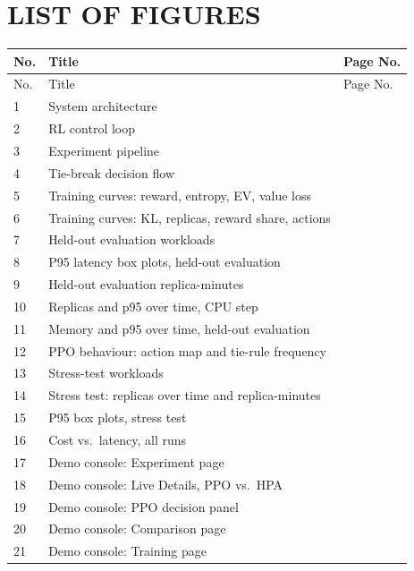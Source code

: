 \chapter*{\centering LIST OF FIGURES}
\label{ch:lof}

\begin{center}
\small
\renewcommand{\arraystretch}{0.92}
\begin{longtable}{p{1.0cm}p{10.5cm}p{2.0cm}}
\toprule
No. & Title & Page No. \\
\midrule
\endfirsthead
\toprule
No. & Title & Page No. \\
\midrule
\endhead
1 & System architecture & \pageref{fig:system-architecture} \\
2 & RL control loop & \pageref{fig:rl-control-loop} \\
3 & Experiment pipeline & \pageref{fig:experiment-pipeline} \\
4 & Tie-break decision flow & \pageref{fig:tie-break-flow} \\
5 & Training curves: reward, entropy, EV, value loss & \pageref{fig:training-curves-1} \\
6 & Training curves: KL, replicas, reward share, actions & \pageref{fig:training-curves-2} \\
7 & Held-out evaluation workloads & \pageref{fig:workloads} \\
8 & P95 latency box plots, held-out evaluation & \pageref{fig:eval-box-all} \\
9 & Held-out evaluation replica-minutes & \pageref{fig:eval-replica-minutes} \\
10 & Replicas and p95 over time, CPU step & \pageref{fig:eval-cpu-over-time} \\
11 & Memory and p95 over time, held-out evaluation & \pageref{fig:eval-other-over-time} \\
12 & PPO behaviour: action map and tie-rule frequency & \pageref{fig:ppo-behaviour} \\
13 & Stress-test workloads & \pageref{fig:workloads-stress} \\
14 & Stress test: replicas over time and replica-minutes & \pageref{fig:stress-replicas-and-cost} \\
15 & P95 box plots, stress test & \pageref{fig:stress-box-all} \\
16 & Cost vs.\ latency, all runs & \pageref{fig:cost-vs-latency} \\
17 & Demo console: Experiment page & \pageref{fig:demo-experiment} \\
18 & Demo console: Live Details, PPO vs.\ HPA & \pageref{fig:demo-live-all} \\
19 & Demo console: PPO decision panel & \pageref{fig:demo-decision-panel} \\
20 & Demo console: Comparison page & \pageref{fig:demo-comparison} \\
21 & Demo console: Training page & \pageref{fig:demo-training} \\
\bottomrule
\end{longtable}
\end{center}
